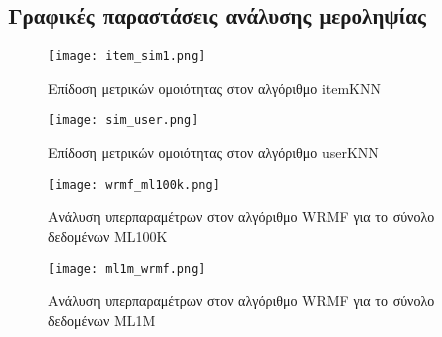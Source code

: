 \cleardoublepage\makeatletter\@openrightfalse\makeatother
\begin{appendices}
\renewcommand{\thesection}{A.\arabic{section}}
\clearpage
\section{Γραφικές παραστάσεις ανάλυσης μεροληψίας}
\vspace{-9.00mm}

\begin{figure}[H]
	\centering		
	\texttt{[image: item\_sim1.png]}
	\vspace*{-5.5mm}
	\caption{Επίδοση μετρικών ομοιότητας στον αλγόριθμο itemKNN}
	\label{fig:sim}
\end{figure}
\begin{figure}[H]
	\centering
	\texttt{[image: sim\_user.png]}
	\caption{Επίδοση μετρικών ομοιότητας στον αλγόριθμο userKNN}
	\label{fig:sim_user}
\end{figure}
\begin{figure}[H]
	\centering
	\texttt{[image: wrmf\_ml100k.png]}
	\caption{Ανάλυση υπερπαραμέτρων στον αλγόριθμο WRMF για το σύνολο δεδομένων ML100K}
	\label{fig:wrmf_ml100k}
\end{figure}
\begin{figure}[H]
	\centering
	\texttt{[image: ml1m\_wrmf.png]}
	\vspace*{-10mm}
	\caption{Ανάλυση υπερπαραμέτρων στον αλγόριθμο WRMF για το σύνολο δεδομένων ML1M}
	\label{fig:wrmf_ml1m}
\end{figure}

\end{appendices}

